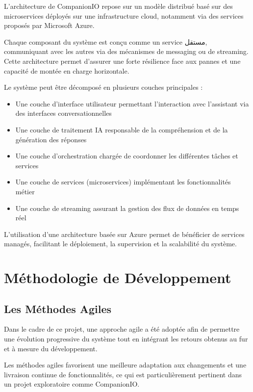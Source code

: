 L’architecture de CompanionIO repose sur un modèle distribué basé sur des microservices déployés sur une infrastructure cloud, notamment via des services proposés par Microsoft Azure.

Chaque composant du système est conçu comme un service مستقل, communiquant avec les autres via des mécanismes de messaging ou de streaming. Cette architecture permet d’assurer une forte résilience face aux pannes et une capacité de montée en charge horizontale.

Le système peut être décomposé en plusieurs couches principales :

\begin{itemize}
    \item Une couche d’interface utilisateur permettant l’interaction avec l’assistant via des interfaces conversationnelles
    \item Une couche de traitement IA responsable de la compréhension et de la génération des réponses
    \item Une couche d’orchestration chargée de coordonner les différentes tâches et services
    \item Une couche de services (microservices) implémentant les fonctionnalités métier
    \item Une couche de streaming assurant la gestion des flux de données en temps réel
\end{itemize}

L’utilisation d’une architecture basée sur Azure permet de bénéficier de services managés, facilitant le déploiement, la supervision et la scalabilité du système.

\section{Méthodologie de Développement}

\subsection{Les Méthodes Agiles}

Dans le cadre de ce projet, une approche agile a été adoptée afin de permettre une évolution progressive du système tout en intégrant les retours obtenus au fur et à mesure du développement.

Les méthodes agiles favorisent une meilleure adaptation aux changements et une livraison continue de fonctionnalités, ce qui est particulièrement pertinent dans un projet exploratoire comme CompanionIO.

